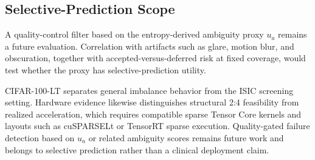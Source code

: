 \documentclass[letterpaper]{article}
\begin{document}
\subsection{Selective-Prediction Scope}
A quality-control filter based on the entropy-derived ambiguity proxy $u_a$ remains a future evaluation. Correlation with artifacts such as glare, motion blur, and obscuration, together with accepted-versus-deferred risk at fixed coverage, would test whether the proxy has selective-prediction utility.

CIFAR-100-LT separates general imbalance behavior from the ISIC screening setting. Hardware evidence likewise distinguishes structural 2:4 feasibility from realized acceleration, which requires compatible sparse Tensor Core kernels and layouts such as cuSPARSELt or TensorRT sparse execution. Quality-gated failure detection based on $u_a$ or related ambiguity scores remains future work and belongs to selective prediction rather than a clinical deployment claim.

\fi
\end{document}

